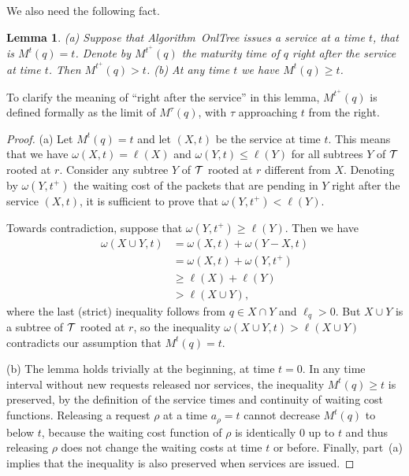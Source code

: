 \documentclass[a4paper]{article}
\newtheorem{lemma}[theorem]{Lemma}
\newcommand{\calT}{{\cal T}}
\newcommand{\length}{\ell}
\newcommand{\OnAlgTreesGeneral}{{\sc OnlTree}}
\newcommand{\vertmaturity}{M}
\begin{document}
We also need the following fact.

\begin{lemma}\label{lem: maturity times of q}
	(a) Suppose that Algorithm~{\OnAlgTreesGeneral} issues a service at
	a time $t$, that is $\vertmaturity^{t}(q) = t$.
	Denote by $\vertmaturity^{t^+}(q)$ the maturity time of $q$ right
	after the service at time $t$. Then $\vertmaturity^{t^+}(q) > t$.
(b) At any time $t$ we have	$\vertmaturity^t(q)\geq t$.
\end{lemma}

To clarify the meaning of ``right after the service''
in this lemma, $\vertmaturity^{t^+}(q)$ is defined formally as the 
limit of $\vertmaturity^{\tau}(q)$, with $\tau$ approaching $t$ from the right.

\begin{proof}
(a) 
Let $\vertmaturity^t(q) = t$ and let $(X,t)$ be the service at time
$t$. This means that we have $\omega(X,t) = \ell(X)$ and
$\omega(Y,t)\leq\ell(Y)$ for all subtrees $Y$ of $\calT$ rooted at
$r$.  Consider any subtree $Y$ of $\calT$ rooted at $r$ different from
$X$.  Denoting by $\omega(Y,t^+)$ the waiting cost of the packets that
are pending in $Y$ right after the service $(X,t)$, it is sufficient
to prove that $\omega(Y,t^+) < \length(Y)$.

Towards contradiction, suppose that $\omega(Y,t^+) \ge \length(Y)$.
Then we have
\begin{align*}
\omega(X\cup Y,t) &= \omega(X,t) + \omega(Y-X,t)
	\\
			&= \omega(X,t) + \omega(Y,t^+)
	\\
			&\ge \length(X) + \length(Y)
	\\
			&> \length(X\cup Y),
\end{align*}
where the last (strict) inequality follows from $q\in X\cap Y$ and
$\length_q > 0$.
But $X\cup Y$ is a subtree of $\calT$ rooted at $r$, so
the inequality $\omega(X\cup Y,t) > \length(X\cup Y)$
contradicts our assumption that $\vertmaturity^t(q) = t$.	

(b)
The lemma holds trivially at the beginning, at time $t=0$. In any time interval
without new requests released nor services, the inequality
$\vertmaturity^t(q)\geq t$ is preserved, by the definition of
the service times and continuity of waiting cost functions.
Releasing a request $\rho$ at a time $a_\rho = t$ 
cannot decrease $\vertmaturity^t(q)$ to below $t$, because the waiting cost function
of $\rho$ is identically 0 up to $t$ and thus
releasing $\rho$ does not change the waiting costs at time $t$ or before. 
Finally, part~(a) implies that the inequality is also preserved when
services are issued.
\end{proof}
\end{document}
